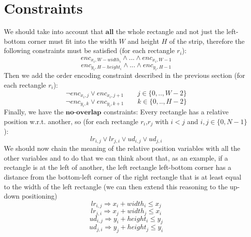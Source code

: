 \section{Constraints}
We should take into account that $\textbf{all}$ the whole rectangle and not just the left-bottom corner must fit into the width $W$ and height $H$ of the strip, therefore the following constraints must be satisfied (for each rectangle $r_i$):
$$enc_{x_{i},W-width_i} \wedge ... \wedge enc_{x_{i},W-1}$$
$$enc_{y_{i},H-height_i} \wedge ... \wedge enc_{y_{i},H-1}$$
Then we add the order encoding constraint described in the previous section (for each rectangle $r_i$):
$$\neg enc_{x_i,j} \vee enc_{x_i,j+1} \qquad j \in \{0,..,W-2\}$$
$$\neg enc_{y_i,k} \vee enc_{y_i,k+1} \qquad k \in \{0,..,H-2\}$$
Finally, we have the $\textbf{no-overlap}$ constraints:
\newline
Every rectangle has a relative position w.r.t. another, so (for each rectangle $r_i$,$r_j$ with $i < j$ and $i,j \in \{0,N-1\}$): 
\begin{equation}\label{satformula:relativeposition}
    lr_{i,j} \vee lr_{j,i} \vee ud_{i,j} \vee ud_{j,i}
\end{equation}
We should now chain the meaning of the relative position variables with all the other variables and to do that we can think about that, as an example, if a rectangle is at the left of another, the left rectangle left-bottom corner has a distance from the bottom-left corner of the right rectangle that is at least equal to the width of the left rectangle (we can then extend this reasoning to the up-down positioning)
\begin{equation}\label{satformula:1}
    lr_{i,j} \Rightarrow x_i + width_i \leq x_j
\end{equation}
\begin{equation}\label{satformula:2}
    lr_{j,i} \Rightarrow x_j + width_j \leq x_i
\end{equation}
\begin{equation}\label{satformula:3}
    ud_{i,j} \Rightarrow y_i + height_i \leq y_j
\end{equation}
\begin{equation}\label{satformula:4}
    ud_{j,i} \Rightarrow y_j + height_j \leq y_i
\end{equation}
\newline
